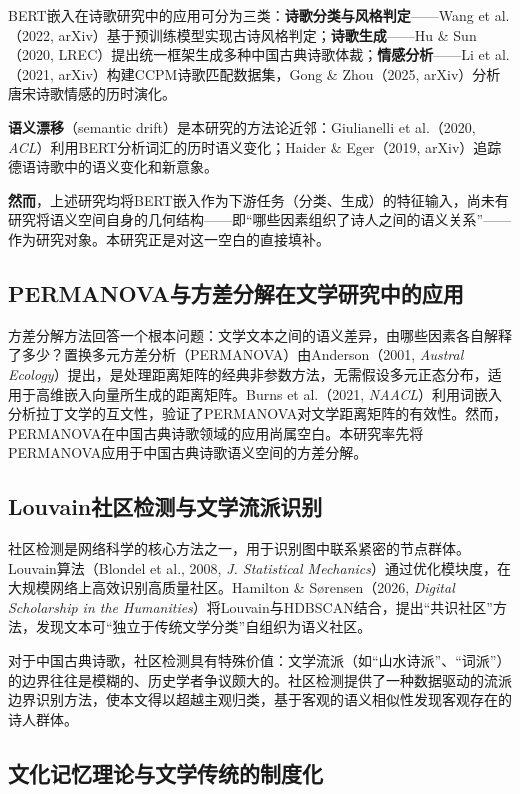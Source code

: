 \documentclass[12pt,a4paper]{article}
\numberwithin{equation}{section}
\begin{document}
BERT嵌入在诗歌研究中的应用可分为三类：\textbf{诗歌分类与风格判定}——Wang et al.（2022, arXiv）基于预训练模型实现古诗风格判定；\textbf{诗歌生成}——Hu \& Sun（2020, LREC）提出统一框架生成多种中国古典诗歌体裁；\textbf{情感分析}——Li et al.（2021, arXiv）构建CCPM诗歌匹配数据集，Gong \& Zhou（2025, arXiv）分析唐宋诗歌情感的历时演化。

\textbf{语义漂移}（semantic drift）是本研究的方法论近邻：Giulianelli et al.（2020, \textit{ACL}）利用BERT分析词汇的历时语义变化；Haider \& Eger（2019, arXiv）追踪德语诗歌中的语义变化和新意象。

\textbf{然而}，上述研究均将BERT嵌入作为下游任务（分类、生成）的特征输入，尚未有研究将语义空间自身的几何结构——即“哪些因素组织了诗人之间的语义关系”——作为研究对象。本研究正是对这一空白的直接填补。

\subsection{PERMANOVA与方差分解在文学研究中的应用}

方差分解方法回答一个根本问题：文学文本之间的语义差异，由哪些因素各自解释了多少？置换多元方差分析（PERMANOVA）由Anderson（2001, \textit{Austral Ecology}）提出，是处理距离矩阵的经典非参数方法，无需假设多元正态分布，适用于高维嵌入向量所生成的距离矩阵。Burns et al.（2021, \textit{NAACL}）利用词嵌入分析拉丁文学的互文性，验证了PERMANOVA对文学距离矩阵的有效性。然而，PERMANOVA在中国古典诗歌领域的应用尚属空白。本研究率先将PERMANOVA应用于中国古典诗歌语义空间的方差分解。

\subsection{Louvain社区检测与文学流派识别}

社区检测是网络科学的核心方法之一，用于识别图中联系紧密的节点群体。Louvain算法（Blondel et al., 2008, \textit{J. Statistical Mechanics}）通过优化模块度，在大规模网络上高效识别高质量社区。Hamilton \& S\o rensen（2026, \textit{Digital Scholarship in the Humanities}）将Louvain与HDBSCAN结合，提出“共识社区”方法，发现文本可“独立于传统文学分类”自组织为语义社区。

对于中国古典诗歌，社区检测具有特殊价值：文学流派（如“山水诗派”、“词派”）的边界往往是模糊的、历史学者争议颇大的。社区检测提供了一种数据驱动的流派边界识别方法，使本文得以超越主观归类，基于客观的语义相似性发现客观存在的诗人群体。

\subsection{文化记忆理论与文学传统的制度化}
\end{document}
